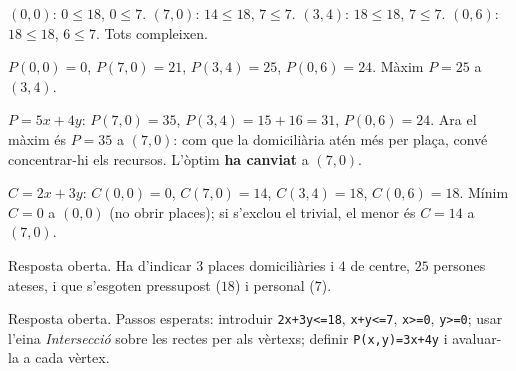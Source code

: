 \begin{solucions}
\begin{sollist}
  \item $(0,0)$: $0\le 18$, $0\le 7$. $(7,0)$: $14\le 18$, $7\le 7$. $(3,4)$:
        $18\le 18$, $7\le 7$. $(0,6)$: $18\le 18$, $6\le 7$. Tots compleixen.
  \item $P(0,0)=0$, $P(7,0)=21$, $P(3,4)=25$, $P(0,6)=24$. Màxim $P=25$ a $(3,4)$.
  \item $P=5x+4y$: $P(7,0)=35$, $P(3,4)=15+16=31$, $P(0,6)=24$. Ara el màxim és
        $P=35$ a $(7,0)$: com que la domiciliària atén més per plaça, convé concentrar-hi
        els recursos. L'òptim \textbf{ha canviat} a $(7,0)$.
  \item $C=2x+3y$: $C(0,0)=0$, $C(7,0)=14$, $C(3,4)=18$, $C(0,6)=18$. Mínim $C=0$ a
        $(0,0)$ (no obrir places); si s'exclou el trivial, el menor és $C=14$ a $(7,0)$.
  \item Resposta oberta. Ha d'indicar $3$ places domiciliàries i $4$ de centre, $25$
        persones ateses, i que s'esgoten pressupost ($18$) i personal ($7$).
  \item Resposta oberta. Passos esperats: introduir \texttt{2x+3y<=18}, \texttt{x+y<=7},
        \texttt{x>=0}, \texttt{y>=0}; usar l'eina \emph{Intersecció} sobre les rectes
        per als vèrtexs; definir \texttt{P(x,y)=3x+4y} i avaluar-la a cada vèrtex.
\end{sollist}
\end{solucions}

